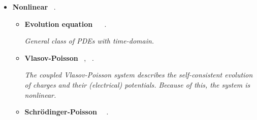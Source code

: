 \documentclass[12pt,letterpaper]{article}
\begin{document}
\begin{itemize}
\begin{itemize}
\begin{itemize}
\begin{itemize}
                            $$
                                \left(\frac{1}{c^2} \frac{\partial^2}{\partial t^2}-\nabla^2+\frac{m^2 c^2}{\hbar^2}\right) \psi(t, \mathbf{x})=0
                            $$
                           
                           \item \textbf{Helmholtz}   ~\cite{eweVariationalQuantumBasedSimulation2022}.

                            \textit{The Helmholtz equation is the eigenvalue problem for the Laplace operator}
                            
                           $$ \nabla^2 f = - k^2 f$$
                           
                           \textit{Important applications include wave-like phenomena and diffusion processes.}
                           
                         \end{itemize}  

				\end{itemize}

            \item \textbf{Nonlinear}  ~\cite{jinQuantumAlgorithmsComputing2022,linKoopmanNeumannMechanics2022}.
            
            \begin{itemize} 
            
    			    \item \textbf{Evolution equation} ~ ~\cite{leongVariationalQuantumEvolution2022}.
                
                    \textit{General class of PDEs with time-domain.}
            
					\item \textbf{Vlasov-Poisson}  ~\cite{Vaszary2026solvingnonlinear},   ~\cite{yeQuantuminspiredMethodSolving2022}. 

                    \textit{The coupled Vlasov-Poisson system describes the self-consistent evolution of charges and their (electrical) potentials. Because of this, the system is nonlinear. }
                    
                    \item \textbf{Schrödinger-Poisson} ~~\cite{moczCosmologicalSimulationsDark2021}.


\end{itemize}
\end{itemize}
\end{itemize}
\end{document}

